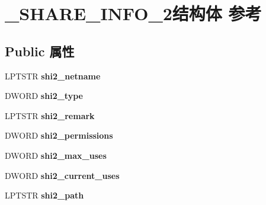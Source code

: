 \hypertarget{struct___s_h_a_r_e___i_n_f_o__2}{}\section{\+\_\+\+S\+H\+A\+R\+E\+\_\+\+I\+N\+F\+O\+\_\+2结构体 参考}
\label{struct___s_h_a_r_e___i_n_f_o__2}
\subsection*{Public 属性}
\begin{DoxyCompactItemize}
\item 
\mbox{\label{struct___s_h_a_r_e___i_n_f_o__2_a5106d8a2873226e654546070b0f37480}} 
L\+P\+T\+S\+TR {\bfseries shi2\+\_\+netname}
\item 
\mbox{\label{struct___s_h_a_r_e___i_n_f_o__2_a907c8d239389423657ed94cc6c7fb4d4}} 
D\+W\+O\+RD {\bfseries shi2\+\_\+type}
\item 
\mbox{\label{struct___s_h_a_r_e___i_n_f_o__2_a27eecc6df5257bc0ba1fd4404bf19969}} 
L\+P\+T\+S\+TR {\bfseries shi2\+\_\+remark}
\item 
\mbox{\label{struct___s_h_a_r_e___i_n_f_o__2_a16e4d7d9a2bdbc3379552113fef5a4e2}} 
D\+W\+O\+RD {\bfseries shi2\+\_\+permissions}
\item 
\mbox{\label{struct___s_h_a_r_e___i_n_f_o__2_aa73fb1c53fdac2d72382a7d2fea6718d}} 
D\+W\+O\+RD {\bfseries shi2\+\_\+max\+\_\+uses}
\item 
\mbox{\label{struct___s_h_a_r_e___i_n_f_o__2_a7d11b7bfcbdac0ec826d4d8aa7794988}} 
D\+W\+O\+RD {\bfseries shi2\+\_\+current\+\_\+uses}
\item 
\mbox{\label{struct___s_h_a_r_e___i_n_f_o__2_a43c24db790086ce8a10bba63b030e4d6}} 
L\+P\+T\+S\+TR {\bfseries shi2\+\_\+path}
\item 
\mbox{\label{struct___s_h_a_r_e___i_n_f_o__2_a169fda8470a73b45750676d99d9f3c4f}} 

\end{DoxyCompactItemize}
